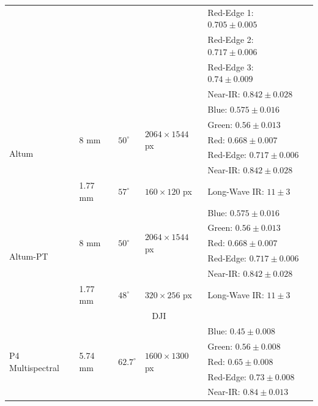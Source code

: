 \begin{table}[htb]
\begin{tabular}{llllll}
        & & & & Red-Edge 1: $0.705 \pm 0.005$ &\\
        & & & & Red-Edge 2: $0.717 \pm 0.006$ &\\
        & & & & Red-Edge 3: $0.74 \pm 0.009$ &\\
        & & & & Near-IR: $0.842 \pm 0.028$ &\\
        \cmidrule{1-6}
        \multirow{6}{*}{Altum}     & \multirow{5}{*}{8 \si{\milli\meter}}   & \multirow{5}{*}{$50^{\circ}$}  & \multirow{5}{*}{$2064 \times 1544$ px} & Blue: $0.575 \pm 0.016$    & \multirow{6}{*}{\cite{hutton_high_2020}}\\
        & & & & Green: $0.56 \pm 0.013$ &\\
        & & & & Red: $0.668 \pm 0.007$ &\\
        & & & & Red-Edge: $0.717 \pm 0.006$ &\\
        & & & & Near-IR: $0.842 \pm 0.028$ &\\
        \cmidrule{2-6}
        & \multirow{1}{*}{1.77 \si{\milli\meter}} & \multirow{1}{*}{$57^{\circ}$} & \multirow{1}{*}{$160 \times 120$ px} & Long-Wave IR: $11 \pm 3$ &\\
        \cmidrule{1-6}
        \multirow{6}{*}{Altum-PT}     & \multirow{5}{*}{8 \si{\milli\meter}}   & \multirow{5}{*}{$50^{\circ}$}  & \multirow{5}{*}{$2064 \times 1544$ px} & Blue: $0.575 \pm 0.016$    & \multirow{6}{*}{\cite{hutton_high_2020}}\\
        & & & & Green: $0.56 \pm 0.013$ &\\
        & & & & Red: $0.668 \pm 0.007$ &\\
        & & & & Red-Edge: $0.717 \pm 0.006$ &\\
        & & & & Near-IR: $0.842 \pm 0.028$ &\\
        \cmidrule{2-6}
        & \multirow{1}{*}{1.77 \si{\milli\meter}} & \multirow{1}{*}{$48^{\circ}$} & \multirow{1}{*}{$320 \times 256$ px} & Long-Wave IR: $11 \pm 3$ &\\
        \cmidrule{1-6}
        \multicolumn{6}{c}{DJI}\\
        \cmidrule{1-6}
        \multirow{5}{*}{P4 Multispectral}     & \multirow{5}{*}{5.74 \si{\milli\meter}}   & \multirow{5}{*}{$62.7^{\circ}$}  & \multirow{5}{*}{$1600 \times 1300$ px} & Blue: $0.45 \pm 0.008$    & \multirow{5}{*}{\cite{lu_experimental_2020}}\\
        & & & & Green: $0.56 \pm 0.008$ &\\
        & & & & Red: $0.65 \pm 0.008$ &\\
        & & & & Red-Edge: $0.73 \pm 0.008$ &\\
        & & & & Near-IR: $0.84 \pm 0.013$ &\\
        \bottomrule
    \end{tabular}
\end{table}
\renewcommand{\arraystretch}{1}

